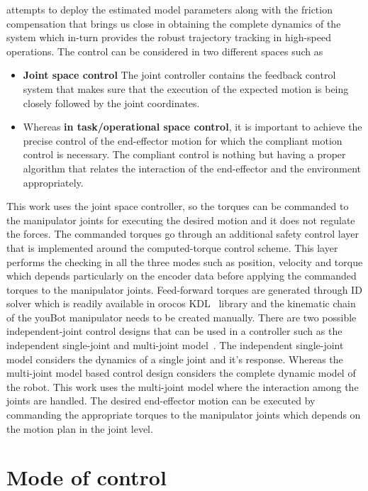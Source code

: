 attempts to deploy the estimated model parameters along with the friction compensation that brings us close in obtaining the complete dynamics of the system which in-turn provides the robust trajectory tracking in high-speed operations. The control can be considered in two different spaces such as

\begin{itemize}
\item \textbf{Joint space control }The joint controller contains the feedback control system that makes sure that the execution of the expected motion is being closely followed by the joint coordinates.
\item Whereas \textbf{in task/operational space control}, it is important to achieve the precise control of the end-effector motion for which the compliant motion control is necessary. The compliant control is nothing but having a proper algorithm that relates the interaction of the end-effector and the environment appropriately.
\end{itemize}

This work uses the joint space controller, so the torques can be commanded to the manipulator joints for executing the desired motion and it does not regulate the forces. The commanded torques go through an additional safety control layer that is implemented around the computed-torque control scheme. This layer performs the checking in all the three modes such as position, velocity and torque which depends particularly on the encoder data before applying the commanded torques to the manipulator joints. Feed-forward torques are generated through ID solver which is readily available in orocos KDL~\cite{smits2011kdl} library and the kinematic chain of the youBot manipulator needs to be created manually. There are two possible independent-joint control designs that can be used in a controller such as the independent single-joint and multi-joint model~\cite{Chung2016}. The independent single-joint model considers the dynamics of a single joint and it's response. Whereas the multi-joint model based control design considers the complete dynamic model of the robot. This work uses the multi-joint model where the interaction among the joints are handled. The desired end-effector motion can be executed by commanding the appropriate torques to the manipulator joints which depends on the motion plan in the joint level.

\section*{Mode of control}

